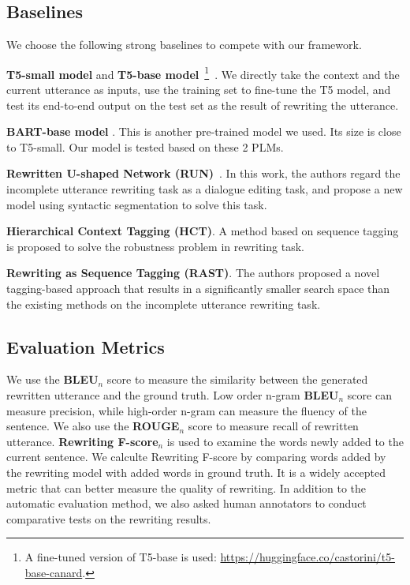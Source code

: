 \subsection{Baselines}
We choose the following strong baselines 
to compete with our framework.

\noindent
\textbf{T5-small model} and \textbf{T5-base model}~\footnote{A fine-tuned version of T5-base is used: \url{https://huggingface.co/castorini/t5-base-canard}.}~\citep{2020t5}. 
We directly take the context and the current utterance as inputs, use the training set to fine-tune the T5 model, and test its end-to-end output on the test set as the result of rewriting the utterance.

\noindent
\textbf{BART-base model} \citep{DBLP:conf/acl/LewisLGGMLSZ20}. This is another pre-trained model we used. Its size is close to T5-small. Our model is tested based on these 2 PLMs.

\noindent
\textbf{Rewritten U-shaped Network (RUN)}~\citep{liu-etal-2020-incomplete}. 
In this work, the authors regard the incomplete utterance rewriting task as a dialogue editing task, and propose a new model using syntactic segmentation to solve this task.

\noindent
\textbf{Hierarchical Context Tagging (HCT)}\citep{hct}. A method based on sequence tagging is proposed to solve the robustness problem in rewriting task.

\noindent
\textbf{Rewriting as Sequence Tagging (RAST)}\citep{DBLP:conf/emnlp/HaoS0XT021}. The authors proposed a novel tagging-based approach that results in a significantly smaller search space than the existing methods on the incomplete utterance rewriting task.





\subsection{Evaluation Metrics}
We use the \textbf{BLEU}$_n$ score \citep{papineni-etal-2002-bleu} to measure the similarity between the generated rewritten utterance and the ground truth. Low order n-gram \textbf{BLEU}$_n$ score can measure precision, while high-order n-gram can measure the fluency of the sentence. 
We also use the \textbf{ROUGE}$_n$ score \citep{lin-2004-rouge} to measure recall of rewritten utterance. 
\textbf{Rewriting F-score}$_n$ \citep{pan-etal-2019-improving}
is used to examine the words newly added to the current sentence. 
We calculte Rewriting F-score by comparing words added by the rewriting model with added words in ground truth.
It is a widely accepted metric that can better measure the quality of rewriting. In addition to the automatic evaluation method, we also asked human annotators to conduct comparative tests on the rewriting results.

